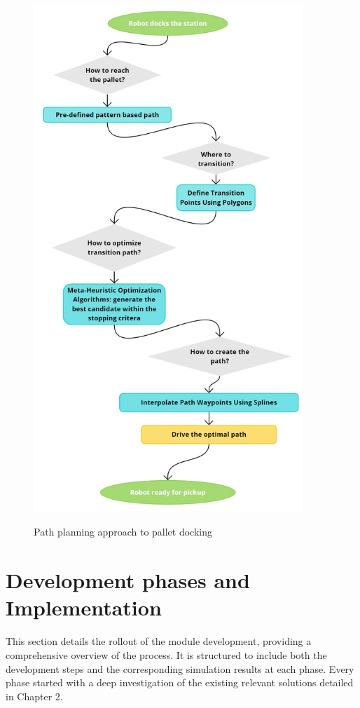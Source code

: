 \begin{figure}[!ht]
    \begin{center}
        \includegraphics[width=4in]{images/Chap2/Approch_design.jpg}\\
        \caption{Path planning approach to pallet docking}
        \label{design}
        \end{center}
\end{figure}

\section{Development phases and Implementation}

This section details the rollout of the module development, providing a comprehensive overview of the process. 
It is structured to include both the development steps and the corresponding simulation results at each phase.
Every phase started with a deep investigation of the existing relevant solutions detailed in Chapter 2.

